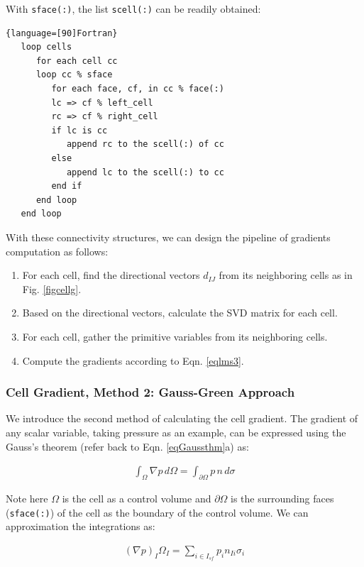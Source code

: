 \documentclass[12pt, letterpaper]{report}
\begin{document}
With \verb+sface(:)+, the list \verb+scell(:)+ can be readily obtained:

\begin{lstlisting}{language=[90]Fortran}
   loop cells
      for each cell cc
      loop cc % sface
         for each face, cf, in cc % face(:)
         lc => cf % left_cell
         rc => cf % right_cell
         if lc is cc
            append rc to the scell(:) of cc
         else
            append lc to the scell(:) to cc
         end if
      end loop
   end loop
\end{lstlisting}

With these connectivity structures, we can design the pipeline of gradients computation as follows:

\begin{enumerate}
   \item For each cell, find the directional vectors $d_{IJ}$ from its neighboring cells as in Fig.
      \ref{figcellg}.
   \item Based on the directional vectors, calculate the SVD matrix for each cell.
   \item For each cell, gather the primitive variables from its neighboring cells.
   \item Compute the gradients according to Eqn. \ref{eqlms3}.
\end{enumerate}

\subsubsection{Cell Gradient, Method 2: Gauss-Green Approach}

We introduce the second method of calculating the cell gradient. The gradient of any scalar
variable, taking pressure as an example, can be expressed using the Gauss's theorem (refer back to
Eqn. \ref{eqGaussthm}a) as:

\begin{align*}
   \int_{\Omega} \nabla p \, d\Omega = \int_{\partial\Omega} p \, n \, d\sigma
\end{align*}

Note here $\Omega$ is the cell as a control volume and $\partial\Omega$ is the surrounding faces
(\verb+sface(:)+) of the cell as the boundary of the control volume. We can approximation the
integrations as:

\begin{align*}
   (\nabla p)_I \Omega_I = \sum_{i \in I_{sf}} p_i n_{Ii} \sigma_i
\end{align*}
\end{document}
